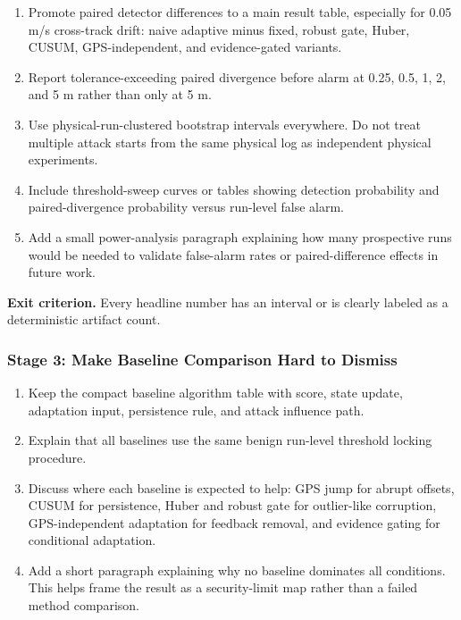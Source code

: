 \begin{enumerate}
    \item Promote paired detector differences to a main result table,
    especially for 0.05 m/s cross-track drift:
    naive adaptive minus fixed, robust gate, Huber, CUSUM, GPS-independent,
    and evidence-gated variants.

    \item Report tolerance-exceeding paired divergence before alarm at
    0.25, 0.5, 1, 2, and 5 m rather than only at 5 m.

    \item Use physical-run-clustered bootstrap intervals everywhere. Do not
    treat multiple attack starts from the same physical log as independent
    physical experiments.

    \item Include threshold-sweep curves or tables showing detection
    probability and paired-divergence probability versus run-level false
    alarm.

    \item Add a small power-analysis paragraph explaining how many prospective
    runs would be needed to validate false-alarm rates or paired-difference
    effects in future work.
\end{enumerate}

\textbf{Exit criterion.} Every headline number has an interval or is clearly
labeled as a deterministic artifact count.

\subsubsection{Stage 3: Make Baseline Comparison Hard to Dismiss}

\begin{enumerate}
    \item Keep the compact baseline algorithm table with score, state update,
    adaptation input, persistence rule, and attack influence path.

    \item Explain that all baselines use the same benign run-level threshold
    locking procedure.

    \item Discuss where each baseline is expected to help: GPS jump for abrupt
    offsets, CUSUM for persistence, Huber and robust gate for outlier-like
    corruption, GPS-independent adaptation for feedback removal, and
    evidence gating for conditional adaptation.

    \item Add a short paragraph explaining why no baseline dominates all
    conditions. This helps frame the result as a security-limit map rather
    than a failed method comparison.
\end{enumerate}

